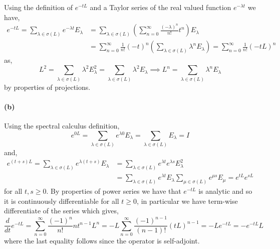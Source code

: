 Using the definition of $e^{-tL}$ and a Taylor series of the real valued function $e^{-\lambda t}$ we have,
\begin{equation*}
	\begin{aligned}
		e^{-tL} = \sum_{\lambda\in\sigma(L)}e^{-\lambda t}E_{\lambda} &= \sum_{\lambda\in\sigma(L)}\left(\sum_{n=0}^{\infty}\frac{(-\lambda)^{n}}{n!}t^{n}\right)E_{\lambda}\\
		&= \sum_{n=0}^{\infty}\frac{1}{n!}(-t)^{n}\left(\sum_{\lambda\in\sigma(L)}\lambda^{n}E_{\lambda}\right) = \sum_{n=0}^{\infty}\frac{1}{n!}(-tL)^{n}
	\end{aligned}
\end{equation*}
as,
\begin{equation*}
	L^{2} = \sum_{\lambda\in\sigma(L)}\lambda^{2}E_{\lambda}^{2} = \sum_{\lambda\in\sigma(L)}\lambda^{2}E_{\lambda} \implies L^{n} = \sum_{\lambda\in\sigma(L)}\lambda^{n}E_{\lambda}
\end{equation*}
by properties of projections.

\paragraph{(b)}
Using the spectral calculus definition,
\begin{equation*}
	e^{0L} = \sum_{\lambda\in\sigma(L)}e^{\lambda 0}E_{\lambda} = \sum_{\lambda\in\sigma(L)}E_{\lambda} = I
\end{equation*}
and,
\begin{equation*}
	\begin{aligned}
		e^{(t+s)L} = \sum_{\lambda\in\sigma(L)}e^{\lambda(t+s)}E_{\lambda} &= \sum_{\lambda\in\sigma(L)}e^{\lambda t}e^{\lambda s}E_{\lambda}^{2}\\
		&= \sum_{\lambda\in\sigma(L)}e^{\lambda t}E_{\lambda}\sum_{\mu\in\sigma(L)}e^{\mu s}E_{\mu} = e^{tL}e^{sL}
	\end{aligned}
\end{equation*}
for all $t,s\geq 0$. By properties of power series we have that $e^{-tL}$ is analytic and so it is continuously differentiable for all $t\geq 0$, in particular we have term-wise differentiate of the series which gives,
\begin{equation*}
	\frac{d}{dt}e^{-tL} = \sum_{n=0}^{\infty}\frac{(-1)^{n}}{n!}nt^{n-1}L^{n} = -L\sum_{n=0}^{\infty}\frac{(-1)^{n-1}}{(n-1)!}(tL)^{n-1} = -Le^{-tL} = -e^{-tL}L
\end{equation*}
where the last equality follows since the operator is self-adjoint.

